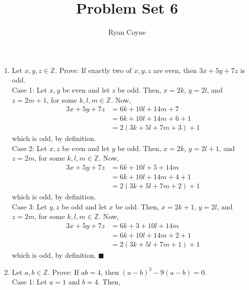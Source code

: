 \documentclass[12pt]{article}
\newcommand{\Z}{\mathbb{Z}}
\begin{document}
    \title{Problem Set 6}
    \author{Ryan Coyne}
    \maketitle

    \begin{enumerate}
        \item Let \(x,y,z\in \mathbb{Z}\). Prove: If exactly two of \(x,y,z\) are even, then \(3x+5y+7z\) is odd.\\ Case 1: Let \(x, y\) be even and let \(z\) be odd. Then, \(x=2k\), \(y=2l\), and \(z = 2m+1\), for some \(k, l, m\in\Z\). Now, \begin{equation*}
            \begin{split}
                3x+5y+7z &= 6k + 10l + 14m+7\\
                &=6k+10l+14m+6+1\\
                &= 2(3k+5l+7m+3)+1
            \end{split}
        \end{equation*}
        which is odd, by definition.\\
        Case 2: Let \(x,z\) be even and let \(y\) be odd. Then, \(x=2k\), \(y=2l+1\), and \(z = 2m\), for some \(k, l, m\in\Z\). Now, \begin{equation*}
            \begin{split}
                3x+5y+7z &= 6k + 10l + 5 + 14m\\
                &=6k+10l+14m+4+1\\
                &= 2(3k+5l+7m+2)+1
            \end{split}
        \end{equation*}
        which is odd, by definition.\\
        Case 3: Let \(y,z\) be odd and let \(x\) be odd. Then, \(x=2k+1\), \(y=2l\), and \(z = 2m\), for some \(k, l, m\in\Z\). Now, \begin{equation*}
            \begin{split}
                3x+5y+7z &= 6k + 3 + 10l + 14m\\
                &=6k+10l+14m+2+1\\
                &= 2(3k+5l+7m+1)+1
            \end{split}
        \end{equation*}
        which is odd, by definition. \(\blacksquare\)
        \item Let \(a,b\in\Z\). Prove: If \(ab=4\), then \((a-b)^3-9(a-b)=0\).\\ Case 1: Let \(a=1\) and \(b=4\). Then, \begin{equation*}

\end{equation*}
\end{enumerate}
\end{document}
